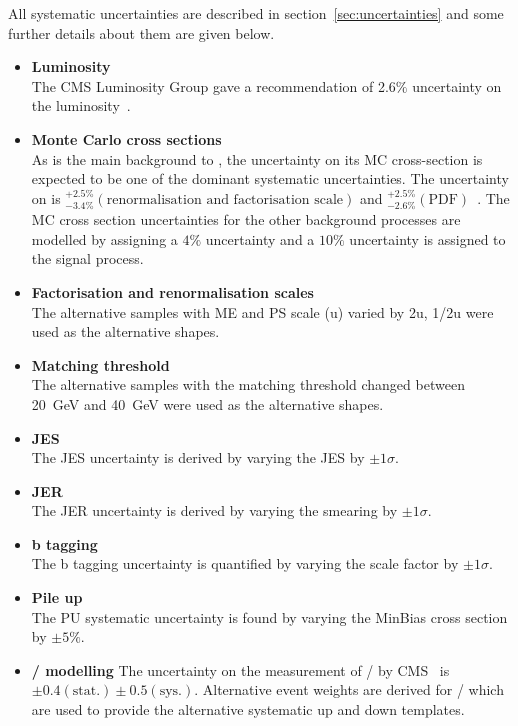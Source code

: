 All systematic uncertainties are described in section~\ref{sec:uncertainties} and some further details about them are given below.

\begin{itemize}
\item \textbf{Luminosity}\\
The CMS Luminosity Group gave a recommendation of 2.6$\%$ uncertainty on the luminosity~\cite{CMS-PAS-LUM-12-001}.
\item \textbf{Monte Carlo cross sections}\\
As \ttbar is the main background to \tttt, the uncertainty on its MC cross-section is expected to be one of the dominant systematic uncertainties. The uncertainty on \ttbar is ${}^{+2.5\%}_{-3.4\%} \left( \textrm{renormalisation and factorisation scale} \right)$ and ${}^{+2.5\%}_{-2.6\%} \left( \textrm{PDF} \right)$~\cite{PhysRevLett.110.252004}. The MC cross section uncertainties for the other background processes are modelled by assigning a $4\%$ uncertainty and a $10\%$ uncertainty is assigned to the signal process.
\item \textbf{Factorisation and renormalisation scales}\\
The alternative \ttbar samples with ME and PS scale (u) varied by 2u, 1/2u were used as the alternative shapes.
\item \textbf{Matching threshold}\\
The alternative \ttbar samples with the matching threshold changed between 20~GeV and 40~GeV were used as the alternative shapes.
\item \textbf{JES}\\
The JES uncertainty is derived by varying the JES by $\pm1\sigma$.
\item \textbf{JER}\\
The JER uncertainty is derived by varying the smearing by $\pm1\sigma$.
\item \textbf{b tagging}\\
The b tagging uncertainty is quantified by varying the scale factor by $\pm1\sigma$.
\item \textbf{Pile up}\\
The PU systematic uncertainty is found by varying the MinBias cross section by $\pm5\%$.
\item \textbf{\heavyflavourone / \heavyflavourtwo modelling}
The uncertainty on the measurement of \heavyflavourone / \heavyflavourtwo by CMS~\cite{Khachatryan2015132} is $\pm 0.4 \left( \textrm{stat.} \right) \pm 0.5 \left(\textrm{sys.} \right)$. Alternative event weights are derived for \heavyflavourone / \heavyflavourtwo which are used to provide the alternative systematic up and down templates.
 \end{itemize}
 
